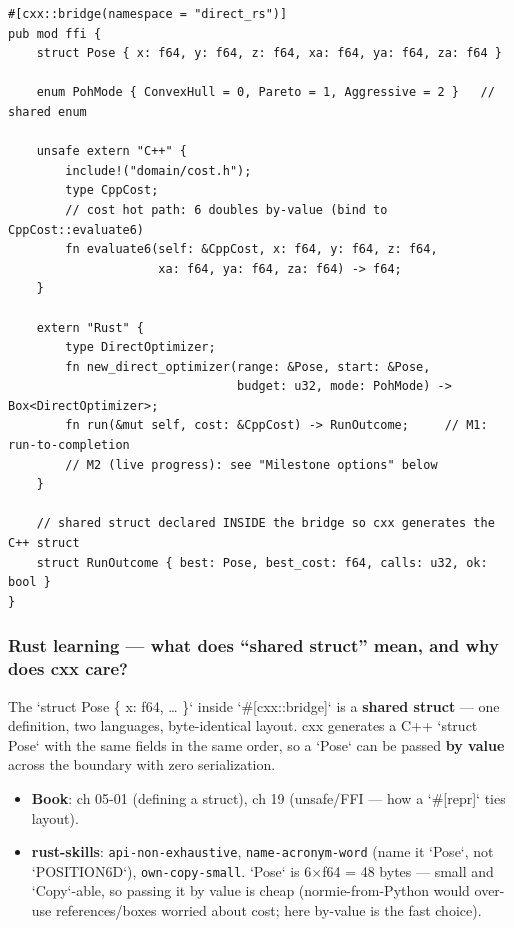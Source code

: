 \documentclass[11pt]{article}
\begin{document}
\begin{verbatim}
#[cxx::bridge(namespace = "direct_rs")]
pub mod ffi {
    struct Pose { x: f64, y: f64, z: f64, xa: f64, ya: f64, za: f64 }

    enum PohMode { ConvexHull = 0, Pareto = 1, Aggressive = 2 }   // shared enum

    unsafe extern "C++" {
        include!("domain/cost.h");
        type CppCost;
        // cost hot path: 6 doubles by-value (bind to CppCost::evaluate6)
        fn evaluate6(self: &CppCost, x: f64, y: f64, z: f64,
                     xa: f64, ya: f64, za: f64) -> f64;
    }

    extern "Rust" {
        type DirectOptimizer;
        fn new_direct_optimizer(range: &Pose, start: &Pose,
                                budget: u32, mode: PohMode) -> Box<DirectOptimizer>;
        fn run(&mut self, cost: &CppCost) -> RunOutcome;     // M1: run-to-completion
        // M2 (live progress): see "Milestone options" below
    }

    // shared struct declared INSIDE the bridge so cxx generates the C++ struct
    struct RunOutcome { best: Pose, best_cost: f64, calls: u32, ok: bool }
}
\end{verbatim}
\subsubsection{Rust learning — what does ``shared struct'' mean, and why does cxx care?}
\label{sec:org54c9231}

The `struct Pose \{ x: f64, \ldots{} \}` inside `\#[cxx::bridge]` is a \textbf{\textbf{shared
struct}} — one definition, two languages, byte-identical layout. cxx
generates a C++ `struct Pose` with the same fields in the same order, so a
`Pose` can be passed \textbf{by value} across the boundary with zero serialization.

\begin{itemize}
\item \textbf{\textbf{Book}}: ch 05-01 (defining a struct), ch 19 (unsafe/FFI — how a `\#[repr]`
ties layout).
\item \textbf{\textbf{rust-skills}}: \texttt{api-non-exhaustive}, \texttt{name-acronym-word} (name it `Pose`,
not `POSITION6D`), \texttt{own-copy-small}. `Pose` is 6×f64 = 48 bytes — small and
`Copy`-able, so passing it by value is cheap (normie-from-Python would
over-use references/boxes worried about cost; here by-value is the fast
choice).
\end{itemize}
\end{document}
